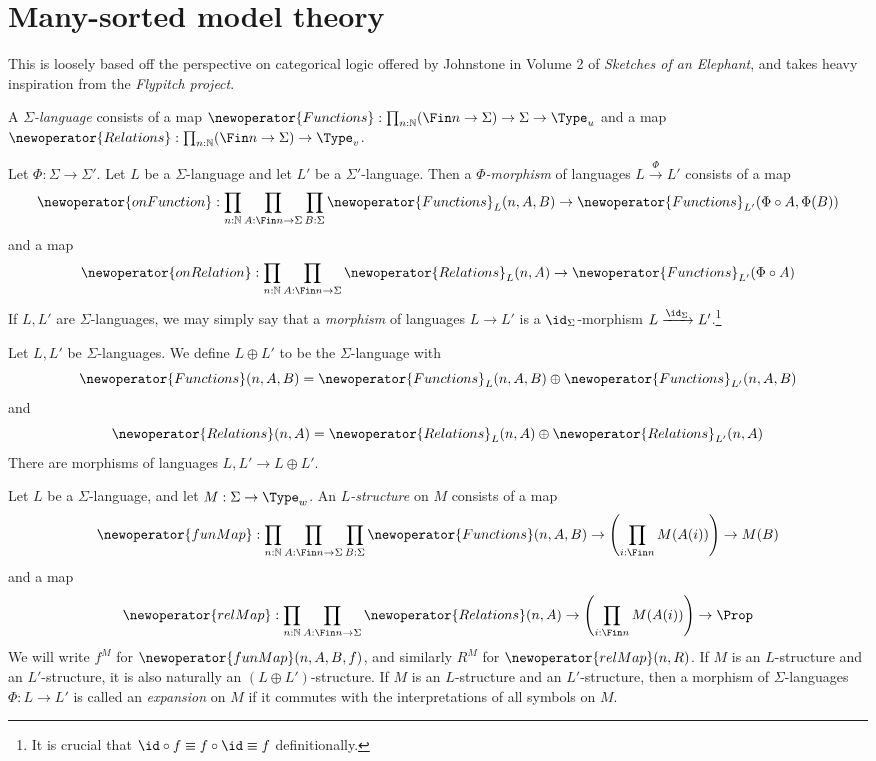 \section{Many-sorted model theory}
This is loosely based off the perspective on categorical logic offered by Johnstone in Volume 2 of \emph{Sketches of an Elephant}, and takes heavy inspiration from the \emph{Flypitch project}.
\begin{definition}
  A \emph{\( \Sigma \)-language} consists of a map \( \newoperator{Functions} : \prod_{n : \mathbb N} (\Fin n \to \Sigma) \to \Sigma \to \Type_u \) and a map \( \newoperator{Relations} : \prod_{n : \mathbb N} (\Fin n \to \Sigma) \to \Type_v \).
\end{definition}
\begin{definition}
  Let \( \Phi : \Sigma \to \Sigma' \).
  Let \( L \) be a \( \Sigma \)-language and let \( L' \) be a \( \Sigma' \)-language.
  Then a \emph{\( \Phi \)-morphism} of languages \( L \xrightarrow\Phi L' \) consists of a map
  \[ \newoperator{onFunction} : \prod_{n : \mathbb N} \prod_{A : \Fin n \to \Sigma} \prod_{B : \Sigma} \newoperator{Functions}_L(n, A, B) \to \newoperator{Functions}_{L'}(\Phi \circ A, \Phi(B)) \]
  and a map
  \[ \newoperator{onRelation} : \prod_{n : \mathbb N} \prod_{A : \Fin n \to \Sigma} \newoperator{Relations}_L(n, A) \to \newoperator{Functions}_{L'}(\Phi \circ A) \]
  If \( L, L' \) are \( \Sigma \)-languages, we may simply say that a \emph{morphism} of languages \( L \to L' \) is a \( \id_\Sigma \)-morphism \( L \xrightarrow{\id_\Sigma} L' \).\footnote{It is crucial that \( \id \circ f \equiv f \circ \id \equiv f \) definitionally.}
\end{definition}
\begin{definition}
  Let \( L, L' \) be \( \Sigma \)-languages.
  We define \( L \oplus L' \) to be the \( \Sigma \)-language with
  \[ \newoperator{Functions}(n, A, B) = \newoperator{Functions}_L(n, A, B) \oplus \newoperator{Functions}_{L'}(n, A, B) \]
  and
  \[ \newoperator{Relations}(n, A) = \newoperator{Relations}_L(n, A) \oplus \newoperator{Relations}_{L'}(n, A) \]
  There are morphisms of languages \( L, L' \to L \oplus L' \).
\end{definition}
\begin{definition}
  Let \( L \) be a \( \Sigma \)-language, and let \( M : \Sigma \to \Type_w \).
  An \emph{\( L \)-structure} on \( M \) consists of a map
  \[ \newoperator{funMap} : \prod_{n : \mathbb N} \prod_{A : \Fin n \to \Sigma} \prod_{B : \Sigma} \newoperator{Functions}(n, A, B) \to \left(\prod_{i : \Fin n} M(A(i)) \right) \to M(B) \]
  and a map
  \[ \newoperator{relMap} : \prod_{n : \mathbb N} \prod_{A : \Fin n \to \Sigma} \newoperator{Relations}(n, A) \to \left(\prod_{i : \Fin n} M(A(i)) \right) \to \Prop \]
  We will write \( f^M \) for \( \newoperator{funMap}(n, A, B, f) \), and similarly \( R^M \) for \( \newoperator{relMap}(n, R) \).
  If \( M \) is an \( L \)-structure and an \( L' \)-structure, it is also naturally an \( (L \oplus L') \)-structure.
  If \( M \) is an \( L \)-structure and an \( L' \)-structure, then a morphism of \( \Sigma \)-languages \( \Phi : L \to L' \) is called an \emph{expansion} on \( M \) if it commutes with the interpretations of all symbols on \( M \).
\end{definition}
